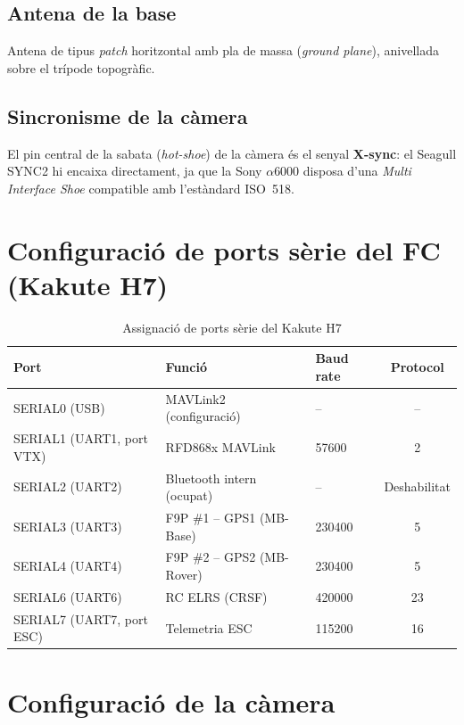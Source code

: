 \subsection{Antena de la base}

Antena de tipus \emph{patch} horitzontal amb pla de massa (\emph{ground plane}), anivellada sobre el trípode topogràfic.

\subsection{Sincronisme de la càmera}

El pin central de la sabata (\emph{hot-shoe}) de la càmera és el senyal \textbf{X-sync}: el Seagull SYNC2 hi encaixa directament, ja que la Sony $\alpha$6000 disposa d'una \emph{Multi Interface Shoe} compatible amb l'estàndard ISO~518.

\section{Configuració de ports sèrie del FC (Kakute H7)}
\label{sec:ports-serie}

\begin{table}[H]
    \centering
    \caption{Assignació de ports sèrie del Kakute H7}
    \label{tab:ports-serie}
    \begin{tabular}{lllc}
        \toprule
        Port & Funció & Baud rate & Protocol \\
        \midrule
        SERIAL0 (USB) & MAVLink2 (configuració) & -- & -- \\
        SERIAL1 (UART1, port VTX) & RFD868x MAVLink & 57600 & 2 \\
        SERIAL2 (UART2) & Bluetooth intern (ocupat) & -- & Deshabilitat \\
        SERIAL3 (UART3) & F9P \#1 -- GPS1 (MB-Base) & 230400 & 5 \\
        SERIAL4 (UART4) & F9P \#2 -- GPS2 (MB-Rover) & 230400 & 5 \\
        SERIAL6 (UART6) & RC ELRS (CRSF) & 420000 & 23 \\
        SERIAL7 (UART7, port ESC) & Telemetria ESC & 115200 & 16 \\
        \bottomrule
    \end{tabular}
\end{table}

\section{Configuració de la càmera}
\label{sec:config-camera}

